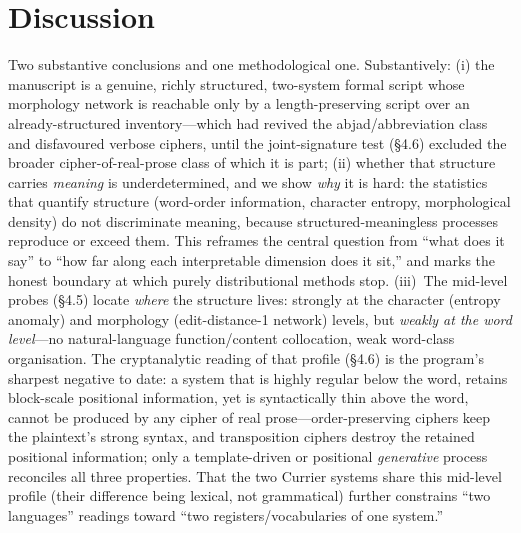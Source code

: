 \documentclass[11pt]{article}
\begin{document}
\section{Discussion}
Two substantive conclusions and one methodological one. Substantively: (i) the
manuscript is a genuine, richly structured, two-system formal script whose morphology
network is reachable only by a length-preserving script over an already-structured
inventory---which had revived the abjad/abbreviation class and disfavoured verbose
ciphers, until the joint-signature test (\S4.6) excluded the broader
cipher-of-real-prose class of which it is part; (ii) whether that structure carries
\emph{meaning} is underdetermined, and we show \emph{why} it is hard: the statistics
that quantify structure (word-order information, character entropy, morphological
density) do not discriminate meaning, because structured-meaningless processes reproduce
or exceed them. This reframes the central question from ``what does it say'' to ``how far
along each interpretable dimension does it sit,'' and marks the honest boundary at which
purely distributional methods stop. (iii)~The mid-level probes (\S4.5) locate
\emph{where} the structure lives: strongly at the character (entropy anomaly) and
morphology (edit-distance-1 network) levels, but \emph{weakly at the word level}---no
natural-language function/content collocation, weak word-class organisation. The
cryptanalytic reading of that profile (\S4.6) is the program's sharpest negative to
date: a system that is highly regular below the word, retains block-scale positional
information, yet is syntactically thin above the word, cannot be produced by any cipher
of real prose---order-preserving ciphers keep the plaintext's strong syntax, and
transposition ciphers destroy the retained positional information; only a template-driven
or positional \emph{generative} process reconciles all three properties. That the two
Currier systems share this mid-level profile (their difference being lexical, not
grammatical) further constrains ``two languages'' readings toward ``two
registers/vocabularies of one system.''
\end{document}
